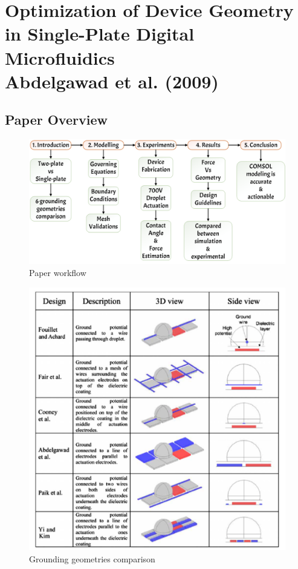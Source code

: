 \chapter[Optimization of Device Geometry in Single-Plate DMF\\{\normalfont Abdelgawad et al. (2009)}]%
{Optimization of Device Geometry in Single-Plate Digital Microfluidics\\[1ex]{\normalfont Abdelgawad et al. (2009)}}

\section{Paper Overview}
\begin{figure}[h!]
    \centering
    \includegraphics[width=\textwidth]{Figures/Abdelgawad_2019_Overview.png}
    \caption{Paper workflow}
\end{figure}

\begin{figure}[h!]
    \centering
    \includegraphics[width=\textwidth]{Figures/Comparison.png}
    \caption{Grounding geometries comparison}

\end{figure}